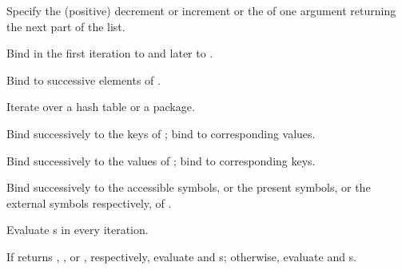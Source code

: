 \begin{LIST}{1cm}
\begin{LIST}{.5cm}
\begin{LIST}{.5cm}
      {
      Specify the (positive) decrement or increment or the
       of one argument returning the next part of the list.
      }

      {
      Bind  in the first iteration to   and later to .
      }

      {
      Bind  to successive elements of .
      }

      {
      Iterate over a hash table or a package.
      }

      \begin{LIST}{.5cm}

        {
        Bind  successively to the keys of ; bind  to corresponding values.
        }

        {
        Bind  successively to the values of ; bind  to corresponding keys.
        }

        {
        Bind  successively to the accessible symbols, or the present
        symbols, or the external symbols respectively, of
        . 
        }

      \end{LIST}
    \end{LIST}
    
    {
    Evaluate s in every iteration.
    }

    {
    If  returns \T, \T, or \NIL, respectively, evaluate
     and s; otherwise, evaluate 
    and s.
    }


\end{LIST}
\end{LIST}

